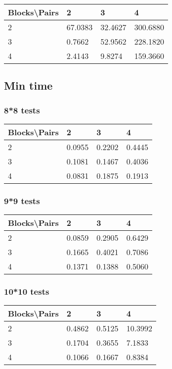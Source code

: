 \documentclass[12pt, a4paper]{article}
\begin{document}
				\begin{tabular}[h]{|l|l|l|l|}
				\hline
				Blocks\textbackslash Pairs & 2 & 3 & 4 \\
				\hline
				2 & 67.0383 & 32.4627 & 300.6880 \\
				\hline
				3 & 0.7662 & 52.9562 & 228.1820 \\
				\hline
				4 & 2.4143 & 9.8274 & 159.3660 \\
				\hline
				\end{tabular}


		\subsection{Min time}

			\subsubsection{8*8 tests}

				\begin{tabular}[h]{|l|l|l|l|}
				\hline
				Blocks\textbackslash Pairs & 2 & 3 & 4 \\
				\hline
				2 & 0.0955 & 0.2202 & 0.4445 \\
				\hline
				3 & 0.1081 & 0.1467 & 0.4036 \\
				\hline
				4 & 0.0831 & 0.1875 & 0.1913 \\
				\hline
				\end{tabular}

			\subsubsection{9*9 tests}

				\begin{tabular}[h]{|l|l|l|l|}
				\hline
				Blocks\textbackslash Pairs & 2 & 3 & 4 \\
				\hline
				2 & 0.0859 & 0.2905 & 0.6429 \\
				\hline
				3 & 0.1665 & 0.4021 & 0.7086 \\
				\hline
				4 & 0.1371 & 0.1388 & 0.5060 \\
				\hline
				\end{tabular}
				
			\subsubsection{10*10 tests}

				\begin{tabular}[h]{|l|l|l|l|}
				\hline
				Blocks\textbackslash Pairs & 2 & 3 & 4 \\
				\hline
				2 & 0.4862 & 0.5125 & 10.3992 \\
				\hline
				3 & 0.1704 & 0.3655 & 7.1833 \\
				\hline
				4 & 0.1066 & 0.1667 & 0.8384 \\
				\hline
				\end{tabular}
\end{document}
